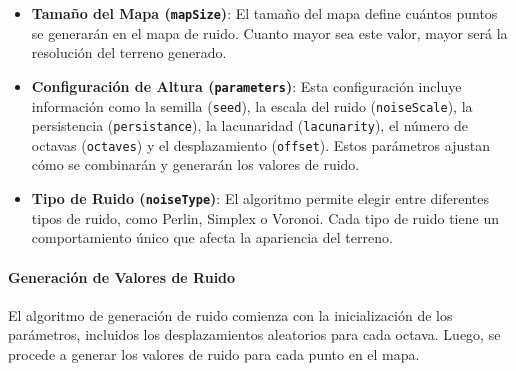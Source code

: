\begin{itemize}
    \item \textbf{Tamaño del Mapa (\texttt{mapSize})}: El tamaño del mapa define cuántos puntos se generarán en el mapa de ruido. Cuanto mayor sea este valor, mayor será la resolución del terreno generado.
    
    \item \textbf{Configuración de Altura (\texttt{parameters})}: Esta configuración incluye información como la semilla (\texttt{seed}), la escala del ruido (\texttt{noiseScale}), la persistencia (\texttt{persistance}), la lacunaridad (\texttt{lacunarity}), el número de octavas (\texttt{octaves}) y el desplazamiento (\texttt{offset}). Estos parámetros ajustan cómo se combinarán y generarán los valores de ruido.
    
    \item \textbf{Tipo de Ruido (\texttt{noiseType})}: El algoritmo permite elegir entre diferentes tipos de ruido, como Perlin, Simplex o Voronoi. Cada tipo de ruido tiene un comportamiento único que afecta la apariencia del terreno.
\end{itemize}

\paragraph{Generación de Valores de Ruido}

El algoritmo de generación de ruido comienza con la inicialización de los parámetros, incluidos los desplazamientos aleatorios para cada octava. Luego, se procede a generar los valores de ruido para cada punto en el mapa.

